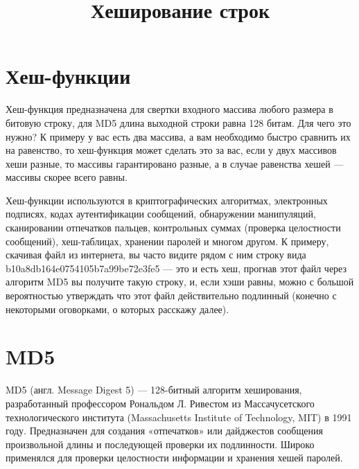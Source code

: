 \documentclass[a4paper, 12pt, oneside]{scrartcl}
\title{Хеширование строк}
\author{}
\date{}
\begin{document}
    \maketitle
    \section{Хеш-функции}\label{sec:section1}
   Хеш-функция предназначена для свертки входного массива любого размера в битовую строку, для MD5 длина выходной строки равна 128 битам. Для чего это нужно?
   К примеру у вас есть два массива, а вам необходимо быстро сравнить их на равенство, то хеш-функция может сделать это за вас, если у двух массивов хеши разные, то массивы гарантировано разные, а в случае равенства хешей — массивы скорее всего равны.
   
   Хеш-функции используются в криптографических алгоритмах, электронных подписях, кодах аутентификации сообщений, обнаружении манипуляций, сканировании отпечатков пальцев, контрольных суммах (проверка целостности сообщений), хеш-таблицах, хранении паролей и многом другом. К примеру, скачивая файл из интернета, вы часто видите рядом с ним строку вида b10a8db164e0754105b7a99be72e3fe5 — это и есть хеш, прогнав этот файл через алгоритм MD5 вы получите такую строку, и, если хэши равны, можно с большой вероятностью утверждать что этот файл действительно подлинный (конечно с некоторыми оговорками, о которых расскажу далее).~\cite{managementsystem}

    \section{MD5}\label{sec:section2}
    MD5 (англ. Message Digest 5) — 128-битный алгоритм хеширования, разработанный профессором Рональдом Л. Ривестом из Массачусетского технологического института (Massachusetts Institute of Technology, MIT) в 1991 году.
    Предназначен для создания «отпечатков» или дайджестов сообщения произвольной длины и последующей проверки их подлинности.
    Широко применялся для проверки целостности информации и хранения хешей паролей.
\end{document}
